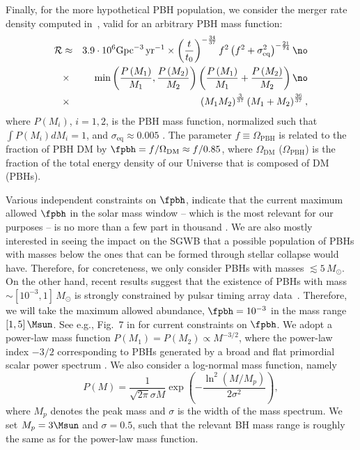 \documentclass[
reprint,           %
superscriptaddress,%
amsmath,           %
amssymb,           %
aps,               %
prd,               %
notitlepage,       %
floatfix,          %
nofootinbib %
]{revtex4-1}
\def\m{\begin{eqnarray}}
\def\n{\end{eqnarray}}
\begin{document}
Finally, for the more hypothetical PBH population, we consider the merger rate density computed in~\cite{Chen:2018czv}, valid for an arbitrary PBH mass function:
\m\label{eq:ratePBH}
	\mathcal{R}&\approx & 3.9 \cdot 10^{6}\mathrm{Gpc}^{-3}\,\mathrm{yr}^{-1} \times\left(\frac{t}{t_{0}}\right)^{-\frac{34}{37}} f^{2}\left(f^{2}+\sigma_{\mathrm{eq}}^{2}\right)^{-\frac{21}{74}} \no\\
	&\times & \min \left(\frac{P\left(M_{1}\right)}{M_{1}}, \frac{P\left(M_{2}\right)}{M_{2}}\right)\left(\frac{P\left(M_{1} \right)}{M_{1}}+\frac{P\left(M_{2} \right)}{M_{2}}\right) \no\\
	&\times &\left(M_{1} M_{2}\right)^{\frac{3}{37}}\left(M_{1}+M_{2}\right)^{\frac{36}{37}},
\n
where $P(M_i)$, $i=1,2$, is the PBH mass function, normalized such that $\int P(M_i)d M_i=1$, and $\sigma_{\mathrm{eq}}\approx0.005$ \cite{Ali-Haimoud:2017rtz}. 
%
The parameter $f\equiv \Omega_{\mathrm{PBH}}$ is related to the fraction of PBH DM by $\fpbh=f/\Omega_{\mathrm{DM}}\approx f/0.85$, where $\Omega_{\mathrm{DM}}$ ($\Omega_{\mathrm{PBH}}$) is the fraction of the total energy density of our Universe that is composed of DM (PBHs). 
%

Various independent constraints on $\fpbh$, indicate that the current maximum allowed $\fpbh$ in the solar mass window -- which is the most relevant for our purposes -- is no more than a few part in thousand \cite{Bird:2016dcv,Chen:2019irf,Carr:2020gox}. We are also mostly interested in seeing the impact on the SGWB that a possible population of PBHs with masses below the ones that can be formed through stellar collapse would have. Therefore, for concreteness, we only consider PBHs with masses $\lesssim 5\, M_{\odot}$. On the other hand, recent results suggest that the existence of PBHs with mass $ \sim [10^{-3}, 1]\, M_{\odot}$ is strongly constrained by pulsar timing array data~\cite{Chen:2019xse}. Therefore, we will take the maximum allowed abundance,  $\fpbh=10^{-3}$ in the mass range $[1,5]\,\Msun$. See e.g., Fig.~7 in \cite{Yuan:2021qgz} for current constraints on $\fpbh$. We adopt a power-law mass function $P(M_1)=P(M_2)\propto M^{-3/2}$, where the power-law index $-3/2$ corresponding to PBHs generated by a broad and flat primordial scalar power spectrum \cite{DeLuca:2020ioi}.  We also consider a log-normal mass function, namely
\begin{equation}\label{log}
P(M)=\frac{1}{\sqrt{2 \pi} \sigma M} \exp \left(-\frac{\ln ^{2}\left(M / M_{p}\right)}{2 \sigma^{2}}\right),
\end{equation}
where $M_p$ denotes the peak mass and $\sigma$ is the width of the mass spectrum. We set $M_p=3\Msun$ and $\sigma=0.5$, such that the relevant BH mass range is roughly the same as for the power-law mass function.
\end{document}
